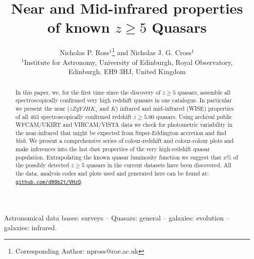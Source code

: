 \documentclass[usenatbib]{mnras}
\begin{document}
\title[Very high-$z$ Quasars]
        {Near and Mid-infrared properties of known $z\geq5$ Quasars}
\author[Ross \& Cross]
       {Nicholas P. Ross$^{1}$\thanks{Corresponding Author: npross@roe.ac.uk} and Nicholas J. G. Cross$^{1}$
\\ 
$^1$Institute for Astronomy, University of Edinburgh, Royal Observatory, Edinburgh, EH9 3HJ, United Kingdom\\
}

\maketitle
\begin{abstract}
In this paper, we, for the first time since the discovery of $z\geq5$
quasars, assemble all spectroscopically confirmed very high redshift
quasars in one catalogue.  In particular we present the near
($zZyYJHK_{s}$ and $K$) infrared and mid-infrared (WISE) properties of
all 463 spectroscopically confirmed redshift $z\geq5.00$ quasars.
Using archival public WFCAM/UKIRT and VIRCAM/VISTA data we check for
photometric variability in the near-infrared that might be expected
from Super-Eddington accretion and find {\it blah}.  We present a
comprehensive series of colour-redshift and colour-colour plots and
make inferences into the hot dust properties of the very high-redshift
quasar population. Extrapolating the known quasar luminosity function
we suggest that $x$\% of the possibly detected $z\geq5$ quasars in the
current datasets have been discovered. 
All the data, analysis codes and plots used and generated here can be found at:
\href{https://github.com/d80b2t/VHzQ}{\tt github.com/d80b2t/VHzQ}.
\end{abstract}


\begin{keywords}
Astronomical data bases: surveys -- 
Quasars: general -- 
galaxies: evolution -- 
galaxies: infrared.
\end{keywords}



\end{document}
